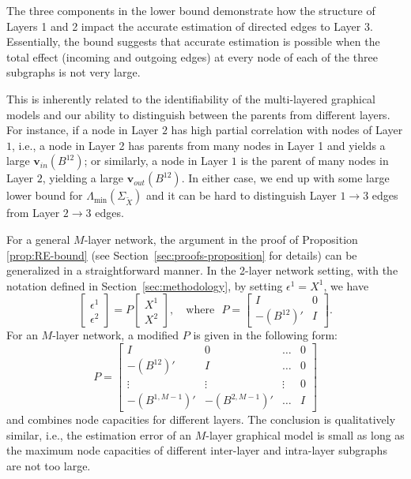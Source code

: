 The three components in the lower bound demonstrate how the structure of Layers 1 and 2 impact the accurate estimation of directed edges to Layer 3. Essentially, the bound suggests that accurate estimation is possible when the total effect (incoming and outgoing edges) at every node of each of the three subgraphs is not very large. 

This is inherently related to the identifiability of the multi-layered graphical models and our ability to distinguish between the parents from different layers. For instance, if a node in Layer $2$ has high partial correlation with nodes of Layer $1$, i.e., a node in Layer 2 has parents from many nodes in Layer 1 and yields a large $\mathbf{v}_{in}(B^{12})$; or similarly, a node in Layer $1$ is the parent of many nodes in Layer $2$, yielding a large $\mathbf{v}_{out}(B^{12})$. In either case, we end up with some large lower bound for $\Lambda_{\min}(\Sigma_{\widetilde{X}})$ and it can be hard to distinguish Layer $1 \rightarrow 3$ edges from Layer $2 \rightarrow 3$ edges.

For a general $M$-layer network, the argument in the proof of Proposition \ref{prop:RE-bound} (see Section~\ref{sec:proofs-proposition} for details) can be generalized in a straightforward manner. In the 2-layer network setting, with the notation defined in Section~\ref{sec:methodology}, by setting $\epsilon^1 = X^1$, we have 
\begin{equation*}
\left[\begin{array}{c}\epsilon^1 \\ \epsilon^2 \end{array} \right] = 
P
\left[\begin{array}{c} X^1 \\ X^2 \end{array} \right],\quad \text{where}~~~ P = \left[\begin{array}{cc}I & 0 \\ -(B^{12})' & I \end{array}\right] .
\end{equation*}
For an $M$-layer network, a modified $P$ is given in the following form: 
\begin{equation*}
P = \left[\begin{array}{cccc}
I & 0 & \ldots & 0 \\ 
-(B^{12})' & I & \ldots & 0 \\
\vdots & \vdots & \vdots & 0 \\
-(B^{1, M-1})' & -(B^{2, M-1})' & \ldots & I
 \end{array} \right]
\end{equation*}
and combines node capacities for different layers. The conclusion is qualitatively similar, i.e., the estimation error of an $M$-layer graphical model is small as long as the maximum node capacities of different inter-layer and intra-layer subgraphs are not too large.

